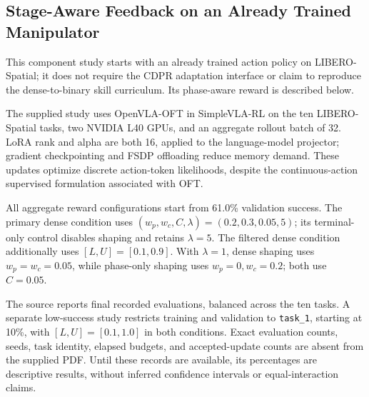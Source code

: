 \subsection{Stage-Aware Feedback on an Already Trained Manipulator}\label{sec:libero_setup}
This component study starts with an already trained action policy on LIBERO-Spatial; it does not require the CDPR adaptation interface or claim to reproduce the dense-to-binary skill curriculum. Its phase-aware reward is described below.

The supplied study uses OpenVLA-OFT in SimpleVLA-RL on the ten LIBERO-Spatial tasks, two NVIDIA L40 GPUs, and an aggregate rollout batch of 32. LoRA rank and alpha are both 16, applied to the language-model projector; gradient checkpointing and FSDP offloading reduce memory demand. These updates optimize discrete action-token likelihoods, despite the continuous-action supervised formulation associated with OFT. 

All aggregate reward configurations start from 61.0\% validation success. The primary dense condition uses $(w_p,w_c,C,\lambda)=(0.2,0.3,0.05,5)$; its terminal-only control disables shaping and retains $\lambda=5$. The filtered dense condition additionally uses $[L,U]=[0.1,0.9]$. With $\lambda=1$, dense shaping uses $w_p=w_c=0.05$, while phase-only shaping uses $w_p=0,w_c=0.2$; both use $C=0.05$.

The source reports final recorded evaluations, balanced across the ten tasks. A separate low-success study restricts training and validation to \texttt{task\_1}, starting at 10\%, with $[L,U]=[0.1,1.0]$ in both conditions. Exact evaluation counts, seeds, task identity, elapsed budgets, and accepted-update counts are absent from the supplied PDF. Until these records are available, its percentages are descriptive results, without inferred confidence intervals or equal-interaction claims.


